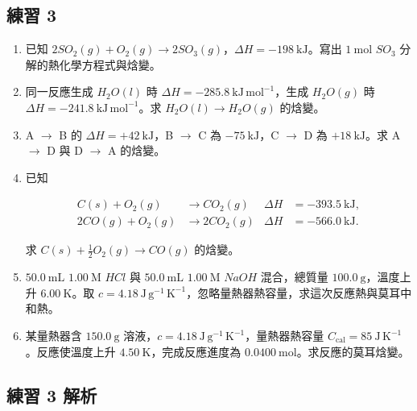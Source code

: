 \documentclass[11pt,a4paper]{article}
\begin{document}
\subsection{練習 3}\label{ux7df4ux7fd2-3}

\begin{enumerate}
\def\labelenumi{\arabic{enumi}.}
\item
  已知 \(2SO_2(g)+O_2(g)\rightarrow2SO_3(g)\)，\(\Delta H=-198\ \mathrm{kJ}\)。寫出 \(1\ \mathrm{mol}\) \(SO_3\) 分解的熱化學方程式與焓變。
\item
  同一反應生成 \(H_2O(l)\) 時 \(\Delta H=-285.8\ \mathrm{kJ\,mol^{-1}}\)，生成 \(H_2O(g)\) 時 \(\Delta H=-241.8\ \mathrm{kJ\,mol^{-1}}\)。求 \(H_2O(l)\rightarrow H_2O(g)\) 的焓變。
\item
  A \(\rightarrow\) B 的 \(\Delta H=+42\ \mathrm{kJ}\)，B \(\rightarrow\) C 為 \(-75\ \mathrm{kJ}\)，C \(\rightarrow\) D 為 \(+18\ \mathrm{kJ}\)。求 A \(\rightarrow\) D 與 D \(\rightarrow\) A 的焓變。
\item
  已知

  \[
  \begin{aligned}
  C(s)+O_2(g)&\rightarrow CO_2(g)&\Delta H&=-393.5\ \mathrm{kJ},\\
  2CO(g)+O_2(g)&\rightarrow2CO_2(g)&\Delta H&=-566.0\ \mathrm{kJ}.
  \end{aligned}
  \]

  求 \(C(s)+\frac12O_2(g)\rightarrow CO(g)\) 的焓變。
\item
  \(50.0\ \mathrm{mL}\) \(1.00\ \mathrm M\) \(HCl\) 與 \(50.0\ \mathrm{mL}\) \(1.00\ \mathrm M\) \(NaOH\) 混合，總質量 \(100.0\ \mathrm g\)，溫度上升 \(6.00\ \mathrm K\)。取 \(c=4.18\ \mathrm{J\,g^{-1}\,K^{-1}}\)，忽略量熱器熱容量，求這次反應熱與莫耳中和熱。
\item
  某量熱器含 \(150.0\ \mathrm g\) 溶液，\(c=4.18\ \mathrm{J\,g^{-1}\,K^{-1}}\)，量熱器熱容量 \(C_{\text{cal}}=85\ \mathrm{J\,K^{-1}}\)。反應使溫度上升 \(4.50\ \mathrm K\)，完成反應進度為 \(0.0400\ \mathrm{mol}\)。求反應的莫耳焓變。
\end{enumerate}

\subsection{練習 3 解析}\label{ux7df4ux7fd2-3-ux89e3ux6790}
\end{document}
